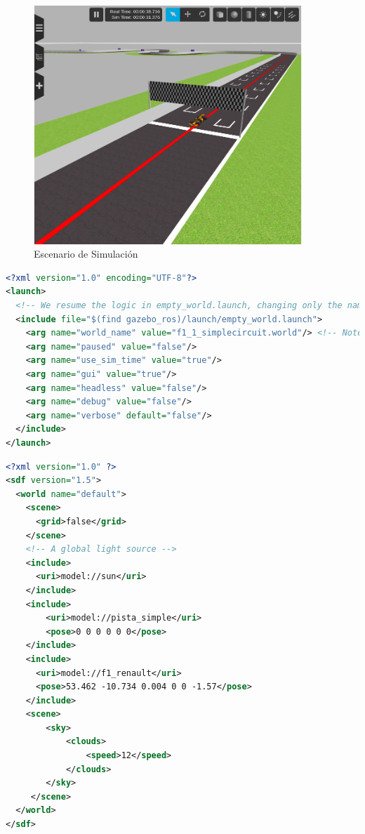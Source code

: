 \begin{figure}[!hbtp]  \centering\noindent
    \includegraphics[width=0.9\textwidth]{figures/world_gazebo.png}
    \caption{Escenario de Simulación}
    \label{gzworld}
\end{figure}

\begin{lstlisting}[language=XML, caption=Configuración de Lanzamiento de Simulaciones]
<?xml version="1.0" encoding="UTF-8"?>
<launch>
  <!-- We resume the logic in empty_world.launch, changing only the name of the world to be launched -->
  <include file="$(find gazebo_ros)/launch/empty_world.launch">
    <arg name="world_name" value="f1_1_simplecircuit.world"/> <!-- Note: the world_name is with respect to GAZEBO_RESOURCE_PATH environmental variable -->
    <arg name="paused" value="false"/>
    <arg name="use_sim_time" value="true"/>
    <arg name="gui" value="true"/>
    <arg name="headless" value="false"/>
    <arg name="debug" value="false"/>
    <arg name="verbose" default="false"/>
  </include>  
</launch>
\end{lstlisting}

\begin{lstlisting}[language=XML, caption=Configuración de Lanzamiento de Simulaciones]
<?xml version="1.0" ?>
<sdf version="1.5">
  <world name="default">
    <scene>
      <grid>false</grid>
    </scene>
    <!-- A global light source -->
    <include>
      <uri>model://sun</uri>
    </include>
    <include>
	    <uri>model://pista_simple</uri>
	    <pose>0 0 0 0 0 0</pose>
    </include>
    <include>
      <uri>model://f1_renault</uri>
      <pose>53.462 -10.734 0.004 0 0 -1.57</pose>
    </include>
    <scene>
        <sky>
            <clouds>
                <speed>12</speed>
            </clouds>
        </sky>
     </scene>
  </world>
</sdf>
\end{lstlisting}

